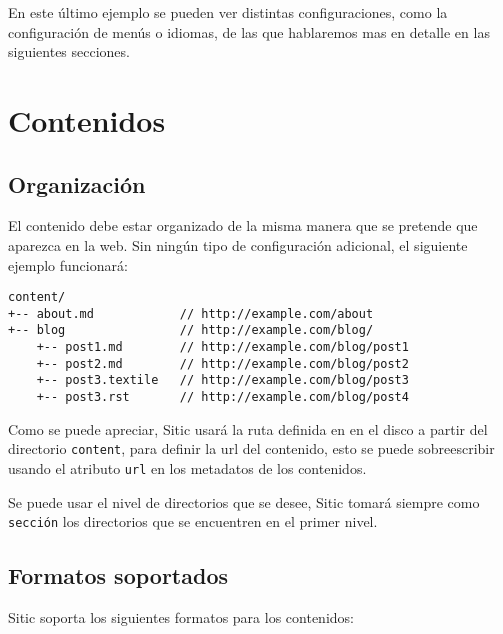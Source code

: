 En este último ejemplo se pueden ver distintas configuraciones, como la configuración de menús o
idiomas, de las que hablaremos mas en detalle en las siguientes secciones.



\section{Contenidos}

\subsection{Organización}

El contenido debe estar organizado de la misma manera que se pretende que aparezca en la web.
Sin ningún tipo de configuración adicional, el siguiente ejemplo funcionará:

\begin{verbatim}
content/
+-- about.md            // http://example.com/about
+-- blog                // http://example.com/blog/
    +-- post1.md        // http://example.com/blog/post1
    +-- post2.md        // http://example.com/blog/post2
    +-- post3.textile   // http://example.com/blog/post3
    +-- post3.rst       // http://example.com/blog/post4
\end{verbatim}

Como se puede apreciar, Sitic usará la ruta definida en en el disco a partir del directorio \texttt{content},
para definir la url del contenido, esto se puede sobreescribir usando el atributo \texttt{url} en los metadatos
de los contenidos.

Se puede usar el nivel de directorios que se desee, Sitic tomará siempre como \texttt{sección} los
directorios que se encuentren en el primer nivel.

\subsection{Formatos soportados}

Sitic soporta los siguientes formatos para los contenidos:

